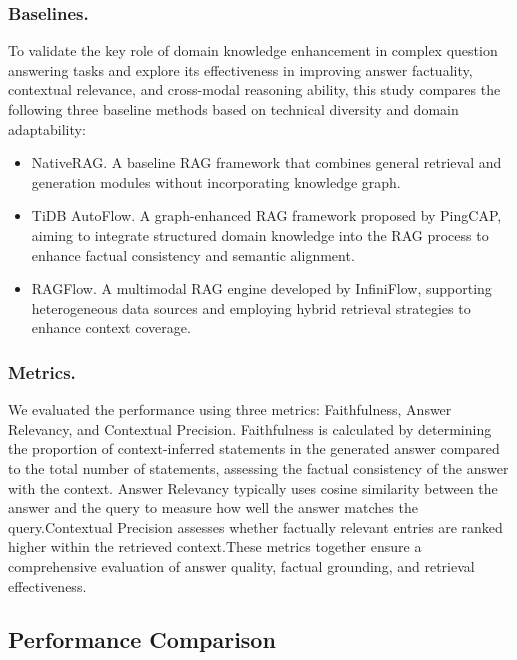 \documentclass[runningheads]{llncs}
\begin{document}
\subsubsection{Baselines.} 
To validate the key role of domain knowledge enhancement in complex question answering tasks and explore its effectiveness in improving answer factuality, contextual relevance, and cross-modal reasoning ability, this study compares the following three baseline methods based on technical diversity and domain adaptability:

\begin{itemize}
    \item NativeRAG. A baseline RAG framework that combines general retrieval and generation modules without incorporating knowledge graph.
    \item TiDB AutoFlow. A graph-enhanced RAG framework proposed by PingCAP, aiming to integrate structured domain knowledge into the RAG process to enhance factual consistency and semantic alignment.
    \item RAGFlow. A multimodal RAG engine developed by InfiniFlow, supporting heterogeneous data sources and employing hybrid retrieval strategies to enhance context coverage.
\end{itemize}

\subsubsection{Metrics.} We evaluated the performance using three metrics: Faithfulness, Answer Relevancy, and Contextual Precision. Faithfulness is calculated by determining the proportion of context-inferred statements in the generated answer compared to the total number of statements, assessing the factual consistency of the answer with the context. Answer Relevancy typically uses cosine similarity between the answer and the query to measure how well the answer matches the query.Contextual Precision assesses whether factually relevant entries are ranked higher within the retrieved context.These metrics together ensure a comprehensive evaluation of answer quality, factual grounding, and retrieval effectiveness.

	\subsection{ Performance Comparison}
\end{document}
